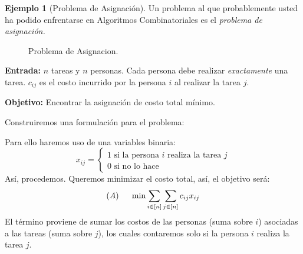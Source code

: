 \documentclass[10pt]{article}
\theoremstyle{plain}
\theoremstyle{definition}
\newtheorem{eje}{Ejemplo}
\begin{document}
\begin{eje}[Problema de Asignación] Un problema al que probablemente usted ha podido enfrentarse en Algoritmos Combinatoriales es el \emph{problema de asignación.}

\begin{figure}[thb]
\centering
{}
\caption{Problema de Asignacion.}
\label{fig:prob_asign}
\end{figure}

\textbf{Entrada:} $n$ tareas y $n$ personas. Cada persona debe realizar \emph{exactamente} una tarea. $c_{ij}$ es el costo incurrido por la persona $i$ al realizar la tarea $j$.

\textbf{Objetivo:} Encontrar la asignación de costo total mínimo.



Construiremos una formulación para el problema:

Para ello haremos uso de una variables binaria:
$$x_{ij}=\begin{cases}1\text{ si la persona } i\text{ realiza la tarea }j\\
0\text{ si no lo hace}
\end{cases}$$
Así, procedemos. Queremos minimizar el costo total, así, el objetivo será:
$$\text{(}A\text{)}\hspace{0.5cm} \min \sum_{i\in[n]}\sum_{j\in [n]}c_{ij} x_{ij}$$
El término proviene de sumar los costos de las personas (suma sobre $i$) asociadas a las tareas (suma sobre $j$), los cuales contaremos solo si la persona $i$ realiza la tarea $j$.


\end{eje}
\end{document}
